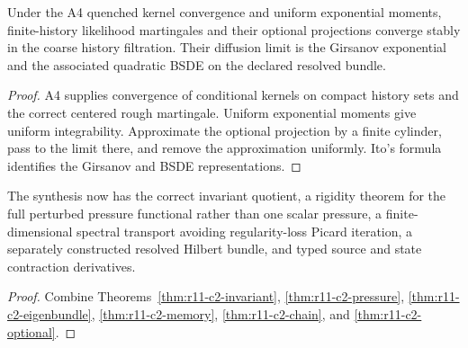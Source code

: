 \begin{theorem}
\label{thm:r11-c2-optional}
Under the A4 quenched kernel convergence and uniform exponential moments,
finite-history likelihood martingales and their optional projections converge
stably in the coarse history filtration.  Their diffusion limit is the
Girsanov exponential and the associated quadratic BSDE on the declared
resolved bundle.
\end{theorem}

\begin{proof}
A4 supplies convergence of conditional kernels on compact history sets and the
correct centered rough martingale.  Uniform exponential moments give uniform
integrability.  Approximate the optional projection by a finite cylinder,
pass to the limit there, and remove the approximation uniformly.  Ito's
formula identifies the Girsanov and BSDE representations.
\end{proof}

\begin{theorem}
\label{thm:r11-c2-main}
The synthesis now has the correct invariant quotient, a rigidity theorem for
the full perturbed pressure functional rather than one scalar pressure, a
finite-dimensional spectral transport avoiding regularity-loss Picard
iteration, a separately constructed resolved Hilbert bundle, and typed source
and state contraction derivatives.
\end{theorem}

\begin{proof}
Combine Theorems~\ref{thm:r11-c2-invariant},
\ref{thm:r11-c2-pressure}, \ref{thm:r11-c2-eigenbundle},
\ref{thm:r11-c2-memory}, \ref{thm:r11-c2-chain}, and
\ref{thm:r11-c2-optional}.
\end{proof}
